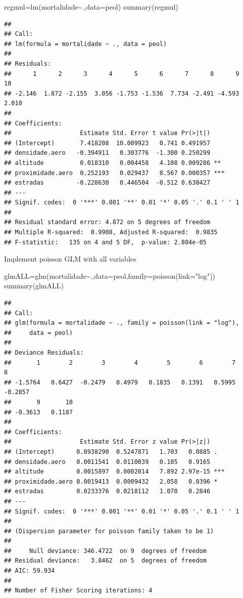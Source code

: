 \documentclass[
]{book}
\newenvironment{Shaded}{\begin{snugshade}}{\end{snugshade}}
\newcommand{\AttributeTok}[1]{\textcolor[rgb]{0.77,0.63,0.00}{#1}}
\newcommand{\FunctionTok}[1]{\textcolor[rgb]{0.00,0.00,0.00}{#1}}
\newcommand{\NormalTok}[1]{#1}
\newcommand{\OtherTok}[1]{\textcolor[rgb]{0.56,0.35,0.01}{#1}}
\newcommand{\SpecialCharTok}[1]{\textcolor[rgb]{0.00,0.00,0.00}{#1}}
\newcommand{\StringTok}[1]{\textcolor[rgb]{0.31,0.60,0.02}{#1}}
\begin{document}
\begin{Shaded}
\begin{Highlighting}[]
\NormalTok{regmul}\OtherTok{=}\FunctionTok{lm}\NormalTok{(mortalidade}\SpecialCharTok{\textasciitilde{}}\NormalTok{.,}\AttributeTok{data=}\NormalTok{peol)}
\FunctionTok{summary}\NormalTok{(regmul)}
\end{Highlighting}
\end{Shaded}

\begin{verbatim}
## 
## Call:
## lm(formula = mortalidade ~ ., data = peol)
## 
## Residuals:
##      1      2      3      4      5      6      7      8      9     10 
## -2.146  1.872 -2.155  3.056 -1.753 -1.536  7.734 -2.491 -4.593  2.010 
## 
## Coefficients:
##                   Estimate Std. Error t value Pr(>|t|)    
## (Intercept)       7.418208  10.009923   0.741 0.491957    
## densidade.aero   -0.394911   0.303776  -1.300 0.250299    
## altitude          0.018310   0.004458   4.108 0.009286 ** 
## proximidade.aero  0.252193   0.029437   8.567 0.000357 ***
## estradas         -0.228630   0.446504  -0.512 0.630427    
## ---
## Signif. codes:  0 '***' 0.001 '**' 0.01 '*' 0.05 '.' 0.1 ' ' 1
## 
## Residual standard error: 4.872 on 5 degrees of freedom
## Multiple R-squared:  0.9908, Adjusted R-squared:  0.9835 
## F-statistic:   135 on 4 and 5 DF,  p-value: 2.804e-05
\end{verbatim}

Implement poisson GLM with all variables

\begin{Shaded}
\begin{Highlighting}[]
\NormalTok{glmALL}\OtherTok{=}\FunctionTok{glm}\NormalTok{(mortalidade}\SpecialCharTok{\textasciitilde{}}\NormalTok{.,}\AttributeTok{data=}\NormalTok{peol,}\AttributeTok{family=}\FunctionTok{poisson}\NormalTok{(}\AttributeTok{link=}\StringTok{"log"}\NormalTok{))}
\FunctionTok{summary}\NormalTok{(glmALL)}
\end{Highlighting}
\end{Shaded}

\begin{verbatim}
## 
## Call:
## glm(formula = mortalidade ~ ., family = poisson(link = "log"), 
##     data = peol)
## 
## Deviance Residuals: 
##       1        2        3        4        5        6        7        8  
## -1.5764   0.6427  -0.2479   0.4979   0.1835   0.1391   0.5995  -0.2857  
##       9       10  
## -0.3613   0.1187  
## 
## Coefficients:
##                   Estimate Std. Error z value Pr(>|z|)    
## (Intercept)      0.8938290  0.5247871   1.703   0.0885 .  
## densidade.aero   0.0011541  0.0110039   0.105   0.9165    
## altitude         0.0015897  0.0002014   7.892 2.97e-15 ***
## proximidade.aero 0.0019413  0.0009432   2.058   0.0396 *  
## estradas         0.0233376  0.0218112   1.070   0.2846    
## ---
## Signif. codes:  0 '***' 0.001 '**' 0.01 '*' 0.05 '.' 0.1 ' ' 1
## 
## (Dispersion parameter for poisson family taken to be 1)
## 
##     Null deviance: 346.4722  on 9  degrees of freedom
## Residual deviance:   3.8462  on 5  degrees of freedom
## AIC: 59.934
## 
## Number of Fisher Scoring iterations: 4
\end{verbatim}
\end{document}
